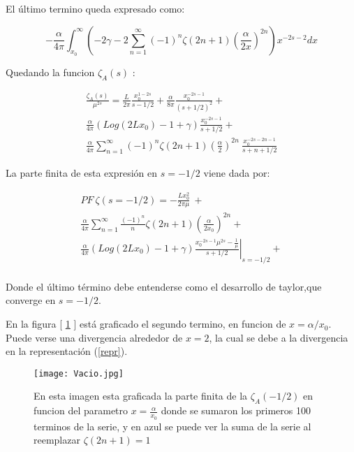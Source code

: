 El último termino queda expresado como:

\begin{equation}
- \frac{\alpha}{4 \pi}
\int _{x_0} ^{\infty}
\left(
-2 \gamma -
2 \sum _{n=1} ^{\infty} 
(-1) ^{n}
\zeta (2n+1) 
\left( \frac{\alpha}{2 x} \right) ^{2n}
\right)
x ^{-2s-2} dx
\end{equation}

Quedando la funcion $\zeta _A (s) $ :

\begin{equation}
\begin{array}{c}
\frac{\zeta _A (s)}{\mu ^{2s}} = 
\frac{L  }{2 \pi } \frac{ x _0 ^{1-2s} }{s- 1/2} + 
\frac{\alpha  }{8 \pi } \frac{ x_0 ^{-2s-1} }{(s+1/2) ^2} + \\[10pt]


\frac{\alpha  }{4 \pi } 
\left(
Log(2 L x _0 ) -1 + \gamma 
\right)
\frac{x _0 ^{-2s-1}}{s+1/2} + \\[10pt]


\frac{\alpha }{4\pi} 
\sum _{n=1} ^{\infty} (-1) ^{n} \zeta (2n+1) 
( \frac{\alpha}{2 } ) ^{2n} \ \frac{x _0 ^{-2s-2n-1}}{s+n+1/2}
\end{array}
\end{equation}

La parte finita de esta expresión en $s=-1/2$ viene dada por:

\begin{equation}
\begin{array}{c}

PF \ \zeta (s=-1/2) = 

- \frac{L x_0 ^2}{2 \pi \mu} \ + \\[10pt]

\frac{\alpha}{4 \pi} 
						\sum _{n=1} ^{\infty} \frac{(-1) ^n}{n} \zeta (2n+1)
						\left( \frac{\alpha}{2 x_0 } \right) ^{2n}  + \\[10pt]

\frac{\alpha  }{4 \pi } 
\left(
Log(2 L x _0 ) -1 + \gamma 
\right)
\left. \frac{ x _0 ^{-2s-1} \mu ^{2s} -  \frac{1}{\mu}  }{s+1/2} \right| _{s=-1/2}  + \\[10pt]

					

\end{array}
\end{equation}

Donde el último término debe entenderse como el desarrollo de taylor,que converge en $s=-1/2$.


En la figura [ \ref{fig:vacio} ] está graficado el segundo termino, en funcion de $x = \alpha / x_0$. Puede verse una divergencia alrededor de $x=2$, la cual se debe a la divergencia en la representación (\ref{repr}).

\begin{figure}
    \centering
    \texttt{[image: Vacio.jpg]}
    \caption{En esta imagen esta graficada la parte finita de la $\zeta _A (-1/2) $ en funcion del parametro $x= \frac{\alpha}{x _0}$ donde se sumaron los primeros 100 terminos de la serie, y en azul se puede ver la suma de la serie al reemplazar $\zeta (2n+1) = 1$}
    \label{fig:vacio}
\end{figure}